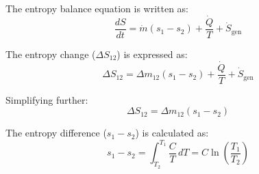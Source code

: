 The entropy balance equation is written as:  
\[
\frac{dS}{dt} = \dot{m}(s_1 - s_2) + \frac{\dot{Q}}{T} + \dot{S}_{\text{gen}}
\]  

The entropy change (\( \Delta S_{12} \)) is expressed as:  
\[
\Delta S_{12} = \Delta m_{12}(s_1 - s_2) + \frac{\dot{Q}}{T} + \dot{S}_{\text{gen}}
\]  

Simplifying further:  
\[
\Delta S_{12} = \Delta m_{12}(s_1 - s_2)
\]  

The entropy difference (\( s_1 - s_2 \)) is calculated as:  
\[
s_1 - s_2 = \int_{T_2}^{T_1} \frac{C}{T} \, dT = C \ln\left(\frac{T_1}{T_2}\right)
\]
